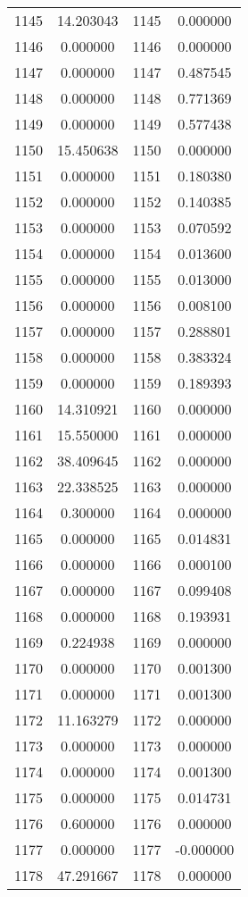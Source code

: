\documentclass[12pt]{article}
\begin{document}
\begin{longtable}{@{}cccc@{}}
1145 & 14.203043 & 1145 & 0.000000 \\
1146 & 0.000000 & 1146 & 0.000000 \\
1147 & 0.000000 & 1147 & 0.487545 \\
1148 & 0.000000 & 1148 & 0.771369 \\
1149 & 0.000000 & 1149 & 0.577438 \\
1150 & 15.450638 & 1150 & 0.000000 \\
1151 & 0.000000 & 1151 & 0.180380 \\
1152 & 0.000000 & 1152 & 0.140385 \\
1153 & 0.000000 & 1153 & 0.070592 \\
1154 & 0.000000 & 1154 & 0.013600 \\
1155 & 0.000000 & 1155 & 0.013000 \\
1156 & 0.000000 & 1156 & 0.008100 \\
1157 & 0.000000 & 1157 & 0.288801 \\
1158 & 0.000000 & 1158 & 0.383324 \\
1159 & 0.000000 & 1159 & 0.189393 \\
1160 & 14.310921 & 1160 & 0.000000 \\
1161 & 15.550000 & 1161 & 0.000000 \\
1162 & 38.409645 & 1162 & 0.000000 \\
1163 & 22.338525 & 1163 & 0.000000 \\
1164 & 0.300000 & 1164 & 0.000000 \\
1165 & 0.000000 & 1165 & 0.014831 \\
1166 & 0.000000 & 1166 & 0.000100 \\
1167 & 0.000000 & 1167 & 0.099408 \\
1168 & 0.000000 & 1168 & 0.193931 \\
1169 & 0.224938 & 1169 & 0.000000 \\
1170 & 0.000000 & 1170 & 0.001300 \\
1171 & 0.000000 & 1171 & 0.001300 \\
1172 & 11.163279 & 1172 & 0.000000 \\
1173 & 0.000000 & 1173 & 0.000000 \\
1174 & 0.000000 & 1174 & 0.001300 \\
1175 & 0.000000 & 1175 & 0.014731 \\
1176 & 0.600000 & 1176 & 0.000000 \\
1177 & 0.000000 & 1177 & -0.000000 \\
1178 & 47.291667 & 1178 & 0.000000 \\

\end{longtable}
\end{document}
